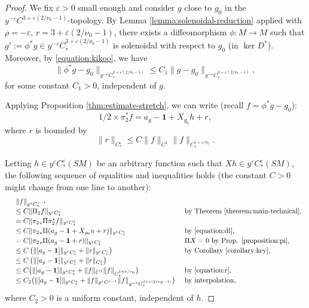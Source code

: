 \documentclass[10pt]{amsart}
\newcommand{\eps}{\varepsilon}
\theoremstyle{plain}
\theoremstyle{definition}
\begin{document}
\begin{proof}
We fix $\eps > 0$ small enough and consider $g$ close to $g_0$ in the $y^{-\eps} C^{3+\eps(2/\nu_0-1)}$-topology. By Lemma \ref{lemma:solenoidal-reduction} applied with $\rho=-\eps$, $r = 3+\eps(2/\nu_0-1)$, there exists a diffeomorphism $\phi : M \to M$ such that $g' := \phi^*g \in y^{-\eps} C^{3+\eps(2/\nu_0-1)}_*$ is solenoidal with respect to $g_0$ (\ie in $\ker D^*$). Moreover, by \eqref{equation:kikoo}, we have
\begin{equation}
\label{equation:boom}
\|\phi^*g-g_0\|_{y^{-\eps} C^{3+\eps(2/\nu_0-1)}_*} \leq C_1 \|g-g_0\|_{y^{-\eps} C^{3+\eps(2/\nu_0-1)}_*},
\end{equation}
for some constant $C_1 > 0$, independent of $g$.

Applying Proposition \ref{thm:estimate-stretch}, we can write (recall $f = \phi^*g-g_0$):
\begin{equation}
\label{equation:dl}
1/2 \times \pi_2^*f = a_{g} - \mathbf{1} + X_{g_0}h + r,
\end{equation}
where $r$ is bounded by
\begin{equation}
\label{equation:r}
\|r\|_{C^\eps_*} \leq C\| f \|_{C^{1}} \| f \|_{C^{1+\eps/\nu_0}_*}.
\end{equation}

Letting $h \in y^\eps C^\eps_*(SM)$ be an arbitrary function such that $Xh \in y^\eps C^\eps_*(SM)$, the following sequence of equalities and inequalities holds (the constant $C >0$ might change from one line to another):
\begin{equation}
\label{equation:long}
\begin{array}{lll}
& \|f\|_{y^\eps C^{\eps-1}_*} \\[2pt]
& \leq C \|\Pi_2f\|_{y^\eps C^{\eps}_*} & \text{ by Theorem \ref{theorem:main-technical}}, \\[2pt]
& = C\|{\pi_2}_* \Pi \pi_2^*f\|_{y^\eps C^{\eps}_*} & \\[2pt]
& \leq C \|{\pi_2}_* \Pi (a_g - \mathbf{1} + X_{g_0}u + r)\|_{y^\eps C^{\eps}_*} & \text{ by \eqref{equation:dl}}, \\[2pt]
& = C\|{\pi_2}_* \Pi (a_g - \mathbf{1} + r)\|_{y^\eps C^{\eps}_*} & \text{ $\Pi X = 0$ by Prop. \ref{proposition:pi},} \\[2pt]
& \leq C \left( \|[a_g-\mathbf{1}]\|_{y^\eps C^{\eps}_*} + \|r\|_{y^\eps C^{\eps}_*}\right) & \text{ by Corollary \ref{corollary:key}, } \\[2pt]
& \leq C \left( \|[a_g-\mathbf{1}]\|_{y^\eps C^{\eps}_*} + \|r\|_{C^{\eps}_*} \right) & \\[2pt]
& \leq C \bigl(\|[a_g-\mathbf{1}]\|_{y^\eps C^{\eps}_*} + \| f \|_{C^{1}} \| f \|_{C^{1+\eps/\nu_0}_*} \bigr) & \text{ by \eqref{equation:r}, } \\[2pt]
& \leq C_2 \bigl(\|[a_g-\mathbf{1}]\|_{y^\eps C^{\eps}_*} + \| f \|_{y^\eps C^{\eps-1}} \| f \|_{y^{-\eps} C^{3+\eps(2/\nu_0-1)}_*} \bigr) & \text{ by interpolation,}
\end{array}
\end{equation}
where $C_2 > 0$ is a uniform constant, independent of $h$.


\end{proof}
\end{document}
